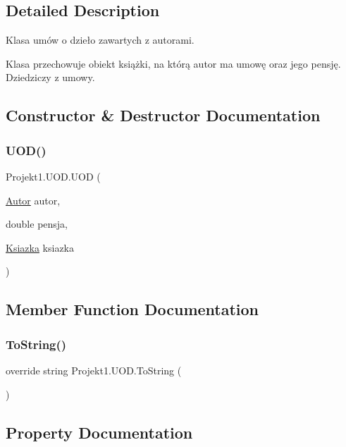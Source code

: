\subsection{Detailed Description}
Klasa umów o dzieło zawartych z autorami. 

Klasa przechowuje obiekt książki, na którą autor ma umowę oraz jego pensję. Dziedziczy z umowy. 

\subsection{Constructor \& Destructor Documentation}
\mbox{\label{class_projekt1_1_1_u_o_d_ac6aa18768a7aaca30891364f90c5d53a}} 
\subsubsection{\texorpdfstring{UOD()}{UOD()}}
{\footnotesize\ttfamily Projekt1.\+U\+O\+D.\+U\+OD (\begin{DoxyParamCaption}\item[{\mbox{\hyperlink{class_projekt1_1_1_autor}{Autor}}}]{autor,  }\item[{double}]{pensja,  }\item[{\mbox{\hyperlink{class_projekt1_1_1_ksiazka}{Ksiazka}}}]{ksiazka }\end{DoxyParamCaption})}



\subsection{Member Function Documentation}
\mbox{\label{class_projekt1_1_1_u_o_d_a4c9a2fce6a84ddb9660486c89407fadb}} 
\subsubsection{\texorpdfstring{ToString()}{ToString()}}
{\footnotesize\ttfamily override string Projekt1.\+U\+O\+D.\+To\+String (\begin{DoxyParamCaption}{ }\end{DoxyParamCaption})}



\subsection{Property Documentation}
\mbox{\label{class_projekt1_1_1_u_o_d_a30825f05cb2a5e24af64bb51f54d3805}} 
